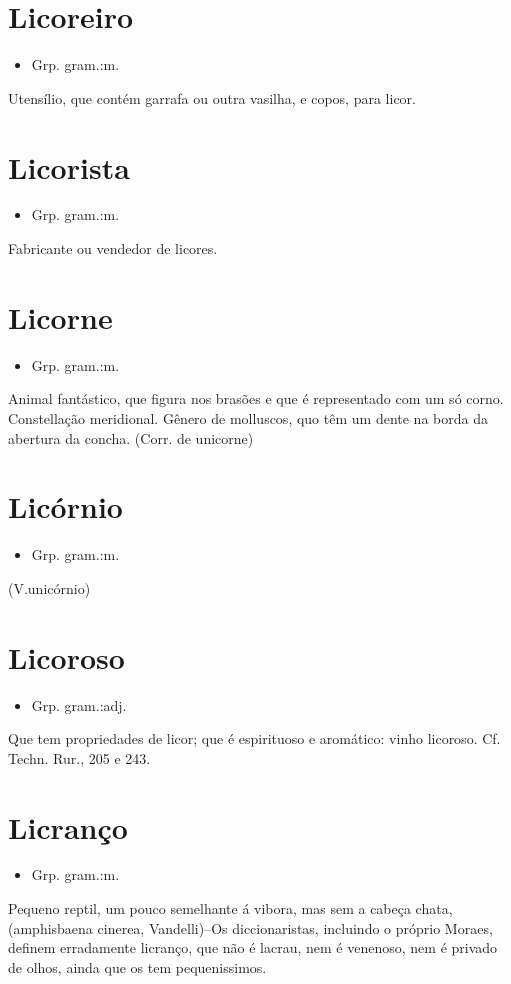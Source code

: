 \section{Licoreiro}
\begin{itemize}
\item {Grp. gram.:m.}
\end{itemize}
Utensílio, que contém garrafa ou outra vasilha, e copos, para licor.
\section{Licorista}
\begin{itemize}
\item {Grp. gram.:m.}
\end{itemize}
Fabricante ou vendedor de licores.
\section{Licorne}
\begin{itemize}
\item {Grp. gram.:m.}
\end{itemize}
Animal fantástico, que figura nos brasões e que é representado com um só corno.
Constellação meridional.
Gênero de molluscos, quo têm um dente na borda da abertura da concha.
(Corr. de \textunderscore unicorne\textunderscore )
\section{Licórnio}
\begin{itemize}
\item {Grp. gram.:m.}
\end{itemize}
(V.unicórnio)
\section{Licoroso}
\begin{itemize}
\item {Grp. gram.:adj.}
\end{itemize}
Que tem propriedades de licor; que é espirituoso e aromático: \textunderscore vinho licoroso\textunderscore . Cf. \textunderscore Techn. Rur.\textunderscore , 205 e 243.
\section{Licranço}
\begin{itemize}
\item {Grp. gram.:m.}
\end{itemize}
Pequeno reptil, um pouco semelhante á vibora, mas sem a cabeça chata, (\textunderscore amphisbaena cinerea\textunderscore , Vandelli)--Os diccionaristas, incluindo o próprio Moraes, definem erradamente \textunderscore licranço\textunderscore , que não é \textunderscore lacrau\textunderscore , nem é venenoso, nem é privado de olhos, ainda que os tem pequenissimos.
